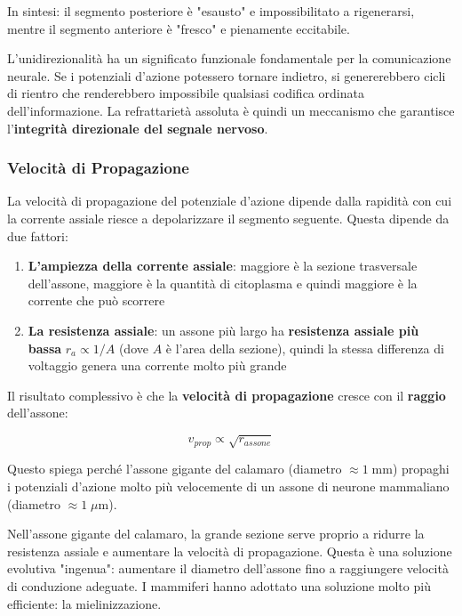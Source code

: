 In sintesi: il segmento posteriore è "esausto" e impossibilitato a rigenerarsi, mentre il segmento anteriore è "fresco" e pienamente eccitabile.

\begin{tcolorbox}[colback=gray!5, colframe=gray!40, arc=2mm, boxrule=0.5pt]
L'unidirezionalità ha un significato funzionale fondamentale per la comunicazione neurale. Se i potenziali d'azione potessero tornare indietro, si genererebbero cicli di rientro che renderebbero impossibile qualsiasi codifica ordinata dell'informazione. La refrattarietà assoluta è quindi un meccanismo che garantisce l'\textbf{integrità direzionale del segnale nervoso}.
\end{tcolorbox}



\subsubsection{Velocità di Propagazione}

La velocità di propagazione del potenziale d'azione dipende dalla rapidità con cui la corrente assiale riesce a depolarizzare il segmento seguente. Questa dipende da due fattori:

\begin{enumerate}
    \item \textbf{L'ampiezza della corrente assiale}: maggiore è la sezione trasversale dell'assone, maggiore è la quantità di citoplasma e quindi maggiore è la corrente che può scorrere
    \item \textbf{La resistenza assiale}: un assone più largo ha \textbf{resistenza assiale più bassa} $r_a \propto 1/A$ (dove $A$ è l'area della sezione), quindi la stessa differenza di voltaggio genera una corrente molto più grande
\end{enumerate}

Il risultato complessivo è che la \textbf{velocità di propagazione} cresce con il \textbf{raggio} dell'assone:

\begin{equation}
v_{prop} \propto \sqrt{r_{assone}}
\end{equation}

Questo spiega perché l'assone gigante del calamaro (diametro $\approx 1 \; \text{mm}$) propaghi i potenziali d'azione molto più velocemente di un assone di neurone mammaliano (diametro $\approx 1 \; \mu\text{m}$).

\begin{tcolorbox}[colback=gray!5, colframe=gray!40, arc=2mm, boxrule=0.5pt]
 Nell'assone gigante del calamaro, la grande sezione serve proprio a ridurre la resistenza assiale e aumentare la velocità di propagazione. Questa è una soluzione evolutiva "ingenua": aumentare il diametro dell'assone fino a raggiungere velocità di conduzione adeguate. I mammiferi hanno adottato una soluzione molto più efficiente: la mielinizzazione.
\end{tcolorbox}



